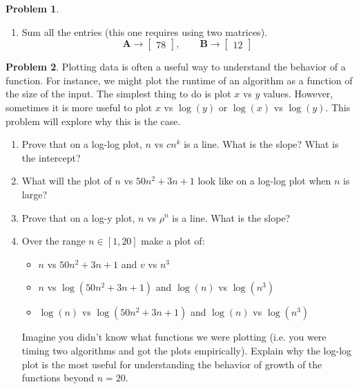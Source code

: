 \documentclass[12pt]{article}
\theoremstyle{definition}
\newtheorem{problem}{Problem}
\renewcommand{\vec}{\mathbf}
\begin{document}
\begin{problem}
\begin{enumerate}
    \item Sum all the entries (this one requires using two matrices).
    \[
        \vec{A} \to  
        \begin{bmatrix}
            78
        \end{bmatrix}
        ,\qquad 
        \vec{B} \to 
        \begin{bmatrix}
            12
        \end{bmatrix}
    \]

    \end{enumerate}
\end{problem}


\begin{problem}
    Plotting data is often a useful way to understand the behavior of a function. For instance, we might plot the runtime of an algorithm as a function of the size of the input.
    The simplest thing to do is plot $x$ vs $y$ values. 
    However, sometimes it is more useful to plot $x$ vs $\log(y)$ or $\log(x)$ vs $\log(y)$.
    This problem will explore why this is the case.

    \begin{enumerate}
        \item Prove that on a log-log plot, $n$ vs $c n^k$ is a line. What is the slope? What is the intercept?
        \item What will the plot of $n$ vs $50n^2 + 3n + 1$ look like on a log-log plot when $n$ is large?
        \item Prove that on a log-y plot, $n$ vs $\rho^n$ is a line. What is the slope?
        \item Over the range $n\in[1,20]$ make a plot of:
        \begin{itemize}
            \item  $n$ vs $50n^2+3n+1$ and $v$ vs $n^3$ 
            \item $n$ vs $\log(50n^2+3n+1)$ and $\log(n)$ vs $\log(n^3)$
            \item $\log(n)$ vs $\log(50n^2+3n+1)$ and $\log(n)$ vs $\log(n^3)$
        \end{itemize}
        
        Imagine you didn't know what functions we were plotting (i.e. you were timing two algorithms and got the plots empirically). 
        Explain why the log-log plot is the most useful for understanding the behavior of growth of the functions beyond $n=20$.
    \end{enumerate}

\end{problem}
\end{document}
